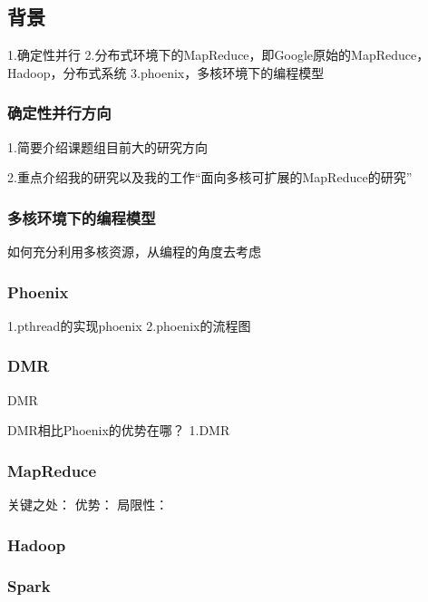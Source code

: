 \subsection{背景}
1.确定性并行
2.分布式环境下的MapReduce，即Google原始的MapReduce，Hadoop，分布式系统
3.phoenix，多核环境下的编程模型

\subsubsection{确定性并行方向}
1.简要介绍课题组目前大的研究方向

2.重点介绍我的研究以及我的工作“面向多核可扩展的MapReduce的研究”

\subsubsection{多核环境下的编程模型}
如何充分利用多核资源，从编程的角度去考虑


\subsubsection{Phoenix}
1.pthread的实现phoenix
2.phoenix的流程图


\subsubsection{DMR}
DMR

DMR相比Phoenix的优势在哪？
1.DMR

\subsubsection{MapReduce}
关键之处：
优势：
局限性：

\subsubsection{Hadoop}

\subsubsection{Spark}
